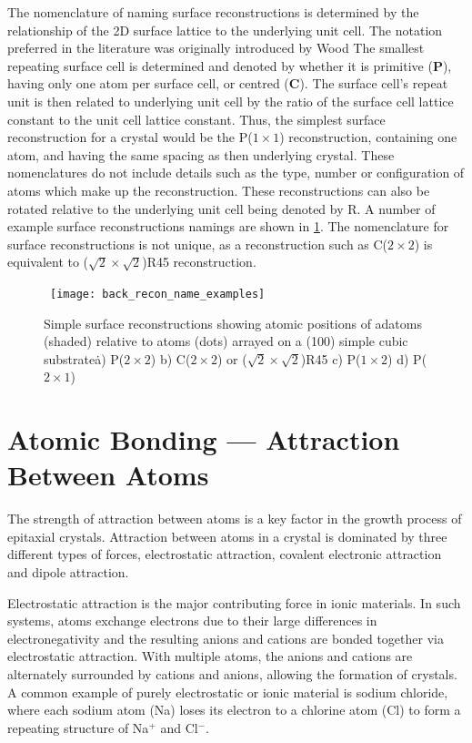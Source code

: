 The nomenclature of naming surface reconstructions is determined by the relationship of the 2D surface lattice to the underlying unit cell. The notation preferred in the literature was originally introduced by Wood\cite{Wood1964} The smallest repeating surface cell is determined and denoted by whether it is primitive (\textbf{P}), having only one atom per surface cell, or centred (\textbf{C}). The surface cell's repeat unit is then related to underlying unit cell by the ratio of the surface cell lattice constant to the unit cell lattice constant. Thus, the simplest surface reconstruction for a crystal would be the P(\(1 \times 1\)) reconstruction, containing one atom, and having the same spacing as then underlying crystal. These nomenclatures do not include details such as the type, number or configuration of atoms which make up the reconstruction. These reconstructions can also be rotated relative to the underlying unit cell being denoted by R. A number of example surface reconstructions namings are shown in \cref{fig:back_recon_name_examples}. The nomenclature for surface reconstructions is not unique, as a reconstruction such as C(\(2\times2\)) is equivalent to (\(\sqrt{2}\times\sqrt{2}\))R45\degree{} reconstruction.
\begin{figure}
    \centering\
    \texttt{[image: back\_recon\_name\_examples]}
    \caption[Examples of surface reconstructions]{\label{fig:back_recon_name_examples}Simple surface reconstructions showing atomic positions of adatoms (shaded) relative to atoms (dots) arrayed on a (100) simple cubic substrate\. a) P(\(2 \times 2\)) b) C(\(2 \times 2\)) or (\(\sqrt{2}\times\sqrt{2}\))R45\degree{} c) P(\(1 \times 2\)) d) P(\(2 \times 1\))}
\end{figure}

\section{Atomic Bonding --- Attraction Between Atoms}
The strength of attraction between atoms is a key factor in the growth process of epitaxial crystals. Attraction between atoms in a crystal is dominated by three different types of forces, electrostatic attraction, covalent electronic attraction and dipole attraction.

Electrostatic attraction is the major contributing force in ionic materials. In such systems, atoms exchange electrons due to their large differences in electronegativity and the resulting anions and cations are bonded together via electrostatic attraction. With multiple atoms, the anions and cations are alternately surrounded by cations and anions, allowing the formation of crystals. A common example of purely electrostatic or ionic material is sodium chloride, where each sodium atom (Na) loses its electron to a chlorine atom (Cl) to form a repeating structure of Na\(^+\) and Cl\(^-\).

